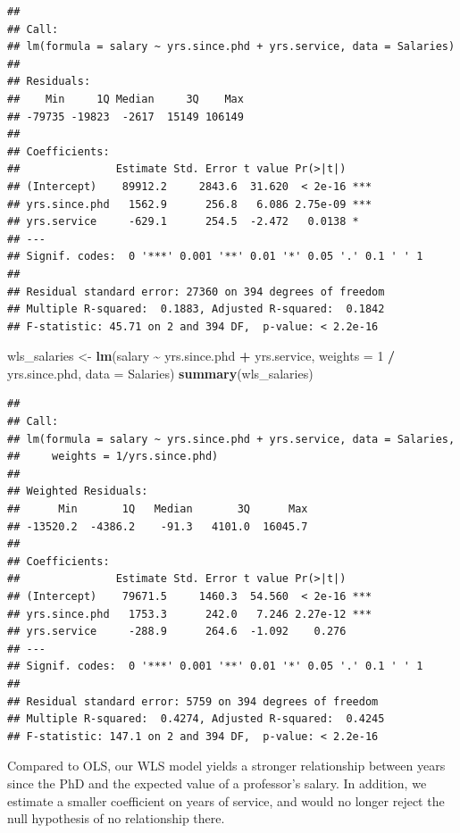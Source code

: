 \documentclass[
  12pt,
  oneside,openany]{book}
\newenvironment{Shaded}{\begin{snugshade}}{\end{snugshade}}
\newcommand{\DataTypeTok}[1]{\textcolor[rgb]{0.13,0.29,0.53}{#1}}
\newcommand{\DecValTok}[1]{\textcolor[rgb]{0.00,0.00,0.81}{#1}}
\newcommand{\KeywordTok}[1]{\textcolor[rgb]{0.13,0.29,0.53}{\textbf{#1}}}
\newcommand{\NormalTok}[1]{#1}
\newcommand{\OperatorTok}[1]{\textcolor[rgb]{0.81,0.36,0.00}{\textbf{#1}}}
\newcommand{\StringTok}[1]{\textcolor[rgb]{0.31,0.60,0.02}{#1}}
\begin{document}
\begin{verbatim}
## 
## Call:
## lm(formula = salary ~ yrs.since.phd + yrs.service, data = Salaries)
## 
## Residuals:
##    Min     1Q Median     3Q    Max 
## -79735 -19823  -2617  15149 106149 
## 
## Coefficients:
##               Estimate Std. Error t value Pr(>|t|)    
## (Intercept)    89912.2     2843.6  31.620  < 2e-16 ***
## yrs.since.phd   1562.9      256.8   6.086 2.75e-09 ***
## yrs.service     -629.1      254.5  -2.472   0.0138 *  
## ---
## Signif. codes:  0 '***' 0.001 '**' 0.01 '*' 0.05 '.' 0.1 ' ' 1
## 
## Residual standard error: 27360 on 394 degrees of freedom
## Multiple R-squared:  0.1883, Adjusted R-squared:  0.1842 
## F-statistic: 45.71 on 2 and 394 DF,  p-value: < 2.2e-16
\end{verbatim}

\begin{Shaded}
\begin{Highlighting}[]
\NormalTok{wls\_salaries \textless{}{-}}\StringTok{ }\KeywordTok{lm}\NormalTok{(salary }\OperatorTok{\textasciitilde{}}\StringTok{ }\NormalTok{yrs.since.phd }\OperatorTok{+}\StringTok{ }\NormalTok{yrs.service,}
                   \DataTypeTok{weights =} \DecValTok{1} \OperatorTok{/}\StringTok{ }\NormalTok{yrs.since.phd,}
                   \DataTypeTok{data =}\NormalTok{ Salaries)}
\KeywordTok{summary}\NormalTok{(wls\_salaries)}
\end{Highlighting}
\end{Shaded}

\begin{verbatim}
## 
## Call:
## lm(formula = salary ~ yrs.since.phd + yrs.service, data = Salaries, 
##     weights = 1/yrs.since.phd)
## 
## Weighted Residuals:
##      Min       1Q   Median       3Q      Max 
## -13520.2  -4386.2    -91.3   4101.0  16045.7 
## 
## Coefficients:
##               Estimate Std. Error t value Pr(>|t|)    
## (Intercept)    79671.5     1460.3  54.560  < 2e-16 ***
## yrs.since.phd   1753.3      242.0   7.246 2.27e-12 ***
## yrs.service     -288.9      264.6  -1.092    0.276    
## ---
## Signif. codes:  0 '***' 0.001 '**' 0.01 '*' 0.05 '.' 0.1 ' ' 1
## 
## Residual standard error: 5759 on 394 degrees of freedom
## Multiple R-squared:  0.4274, Adjusted R-squared:  0.4245 
## F-statistic: 147.1 on 2 and 394 DF,  p-value: < 2.2e-16
\end{verbatim}

Compared to OLS, our WLS model yields a stronger relationship between years since the PhD and the expected value of a professor's salary. In addition, we estimate a smaller coefficient on years of service, and would no longer reject the null hypothesis of no relationship there.
\end{document}
